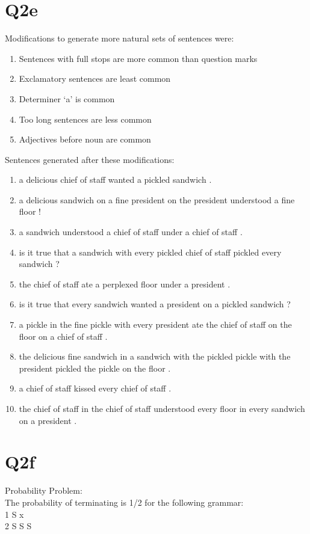 \documentclass[12pt]{article}
\begin{document}
\section*{Q2e}
Modifications to generate more natural sets of sentences were:
\begin{enumerate}
\item {
	Sentences with full stops are more common than question marks
}
\item {
	Exclamatory sentences are least common
}
\item {
	Determiner ‘a’ is common
}
\item {
	Too long sentences are less common
}
\item {
	Adjectives before noun are common
}

\end{enumerate}
Sentences generated after these modifications:
\begin{enumerate}
\item {
	a delicious chief of staff wanted a pickled sandwich . 
}
\item {
	a delicious sandwich on a fine president on the president understood a fine floor ! 
}
\item {
	a sandwich understood a chief of staff under a chief of staff . 
}
\item {
	is it true that a sandwich with every pickled chief of staff pickled every sandwich ? 
}
\item {
	the chief of staff ate a perplexed floor under a president . 
}
\item {
	is it true that every sandwich wanted a president on a pickled sandwich ? 
}
\item {
	a pickle in the fine pickle with every president ate the chief of staff on the floor on a chief of staff . 
}
\item {
	the delicious fine sandwich in a sandwich with the pickled pickle with the president pickled the pickle on the floor . 
}
\item {
	a chief of staff kissed every chief of staff . 
}
\item {
	the chief of staff in the chief of staff understood every floor in every sandwich on a president .
}
\end{enumerate}
\pagebreak
\section*{Q2f}
Probability Problem:\\
The probability of terminating is 1/2 for the following grammar:\\
1\hspace{1cm}	S\hspace{1cm}	x\\
2\hspace{1cm}	S\hspace{1cm}	S S\\
\end{document}
